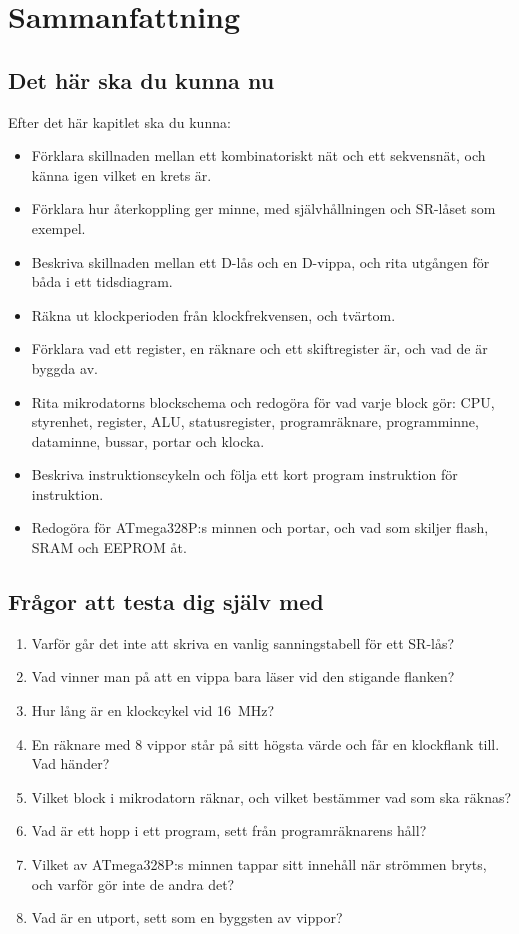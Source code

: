 
\section{Sammanfattning}
\label{c6:sec:summary}

\subsection*{Det här ska du kunna nu}
Efter det här kapitlet ska du kunna:
\begin{itemize}
  \item Förklara skillnaden mellan ett kombinatoriskt nät och ett sekvensnät, och känna igen vilket
    en krets är.
  \item Förklara hur återkoppling ger minne, med självhållningen och SR-låset som exempel.
  \item Beskriva skillnaden mellan ett D-lås och en D-vippa, och rita utgången för båda i ett
    tidsdiagram.
  \item Räkna ut klockperioden från klockfrekvensen, och tvärtom.
  \item Förklara vad ett register, en räknare och ett skiftregister är, och vad de är byggda av.
  \item Rita mikrodatorns blockschema och redogöra för vad varje block gör: CPU, styrenhet,
    register, ALU, statusregister, programräknare, programminne, dataminne, bussar, portar och
    klocka.
  \item Beskriva instruktionscykeln och följa ett kort program instruktion för instruktion.
  \item Redogöra för ATmega328P:s minnen och portar, och vad som skiljer flash, SRAM och EEPROM
    åt.
\end{itemize}

\subsection*{Frågor att testa dig själv med}
\begin{enumerate}
  \item Varför går det inte att skriva en vanlig sanningstabell för ett SR-lås?
  \item Vad vinner man på att en vippa bara läser  vid den stigande flanken?
  \item Hur lång är en klockcykel vid 16~MHz?
  \item En räknare med 8 vippor står på sitt högsta värde och får en klockflank till. Vad händer?
  \item Vilket block i mikrodatorn räknar, och vilket bestämmer vad som ska räknas?
  \item Vad är ett hopp i ett program, sett från programräknarens håll?
  \item Vilket av ATmega328P:s minnen tappar sitt innehåll när strömmen bryts, och varför gör inte
    de andra det?
  \item Vad är en utport, sett som en byggsten av vippor?
\end{enumerate}

